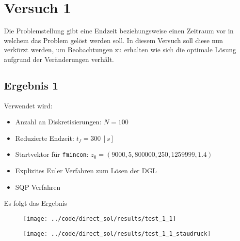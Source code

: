 \newpage
\section{Versuch 1}\label{kap:Versuch1}
Die Problemstellung gibt eine Endzeit beziehungsweise einen Zeitraum vor in welchem das Problem gelöst werden soll. In diesem Versuch soll diese nun verkürzt werden, um Beobachtungen zu erhalten wie sich die optimale Lösung aufgrund der Veränderungen verhält. %

\subsection{Ergebnis 1}\label{kap:Versuch11}
Verwendet wird:
\begin{itemize}
\item Anzahl an Diskretisierungen: $N = 100$ 
\item Reduzierte Endzeit: $t_f = 300 \ [s]$
\item Startvektor für \texttt{fmincon}: $z_0 = (9000,5,800000,250,1259999,1.4)$
\item Explizites Euler Verfahren zum Lösen der DGL
%
\item SQP-Verfahren
\end{itemize}
Es folgt das Ergebnis
\begin{figure}[H]
\begin{center}
\texttt{[image: ../code/direct\_sol/results/test\_1\_1]}
 \label{img:test_1_1}
\end{center}
\end{figure}

\begin{figure}[H]
\begin{center}
\texttt{[image: ../code/direct\_sol/results/test\_1\_1\_staudruck]}
\label{img:test_1_1_staudruck}
\end{center}
\end{figure}




